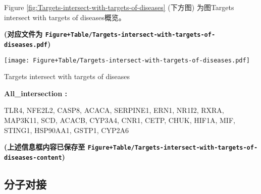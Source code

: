 \documentclass[
]{article}
\begin{document}
\begin{center}\vspace{1.5cm}\end{center}

\begin{center}\vspace{1.5cm}\end{center}

Figure \ref{fig:Targets-intersect-with-targets-of-diseases} (下方图) 为图Targets intersect with targets of diseases概览。

\textbf{(对应文件为 \texttt{Figure+Table/Targets-intersect-with-targets-of-diseases.pdf})}

\def\@captype{figure}
\begin{center}
\texttt{[image: Figure+Table/Targets-intersect-with-targets-of-diseases.pdf]}
\caption{Targets intersect with targets of diseases}\label{fig:Targets-intersect-with-targets-of-diseases}
\end{center}

\begin{center}\vspace{1.5cm}\end{center}\begin{center}\begin{tcolorbox}[colback=gray!10, colframe=gray!50, width=0.9\linewidth, arc=1mm, boxrule=0.5pt]
\textbf{
All\_intersection
:}

\vspace{0.5em}

    TLR4, NFE2L2, CASP8, ACACA, SERPINE1, ERN1, NR1I2,
RXRA, MAP3K11, SCD, ACACB, CYP3A4, CNR1, CETP, CHUK, HIF1A,
MIF, STING1, HSP90AA1, GSTP1, CYP2A6

\vspace{2em}
\end{tcolorbox}
\end{center}

\textbf{(上述信息框内容已保存至 \texttt{Figure+Table/Targets-intersect-with-targets-of-diseases-content})}

\hypertarget{ux5206ux5b50ux5bf9ux63a5}{%
\subsection{分子对接}\label{ux5206ux5b50ux5bf9ux63a5}}
\end{document}

